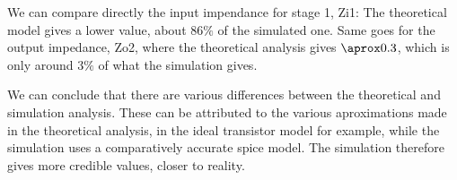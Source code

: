We can compare directly the input impendance for stage 1, Zi1: The theoretical model gives a lower value, about $86\%$ of the simulated one. Same goes for the output impedance, Zo2, where the theoretical analysis gives $\aprox 0.3$, which is only around $3\%$ of what the simulation gives.

\par
We can conclude that there are various differences between the theoretical and simulation analysis. These can be attributed to the various aproximations
made in the theoretical analysis, in the ideal transistor model for example, while the simulation uses a comparatively accurate spice model. The simulation therefore gives more credible values, closer to reality.